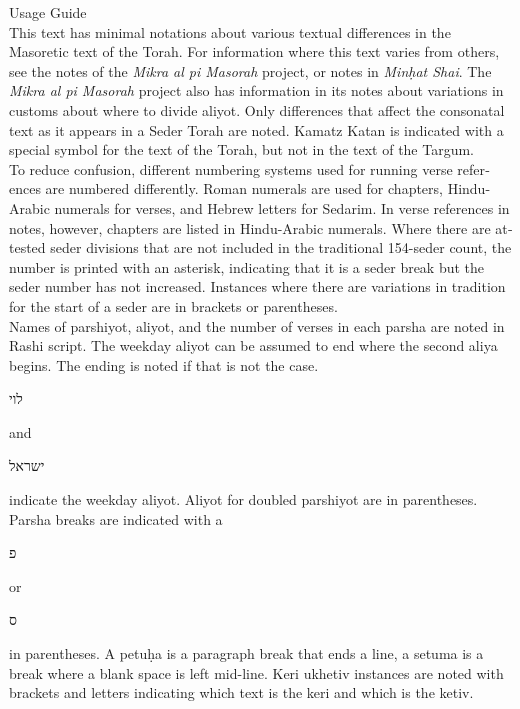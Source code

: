 \clearpage
{}	
\begin{minipage}{\textwidth}\englishfont
	
	\begin{english}
		\vspace{16pt}
		\Large Usage Guide\vspace{12pt}\\
		\normalsize
		This text has minimal notations about various textual differences in the Masoretic text of the Torah. For information where this text varies from others, see the notes of the \textit{Mikra al pi Masorah} project, or notes in \textit{Min\d{h}at Shai}. The \textit{Mikra al pi Masorah} project also has information in its notes about variations in customs about where to divide aliyot. Only differences that affect the consonatal text as it appears in a Seder Torah are noted. Kamatz Katan is indicated with a special symbol for the text of the Torah, but not in the text of the Targum.\\
		
		To reduce confusion, different numbering systems used for running verse references are numbered differently. Roman numerals are used for chapters, Hindu-Arabic numerals for verses, and Hebrew letters for Sedarim. In verse references in notes, however, chapters are listed in Hindu-Arabic numerals. Where there are attested seder divisions that are not included in the traditional 154-seder count, the number is printed with an asterisk, indicating that it is a seder break but the seder number has not increased. Instances where there are variations in tradition for the start of a seder are in brackets or parentheses.\\
		
		Names of parshiyot, aliyot, and the number of verses in each parsha are noted in Rashi script. The weekday aliyot can be assumed to end where the second aliya begins. The ending is noted if that is not the case.   \begin{hebrew}\footnotesize לוי \normalsize\end{hebrew} and  \begin{hebrew}\footnotesize ישראל\normalsize\end{hebrew} indicate the weekday aliyot. Aliyot for doubled parshiyot are in parentheses.\\
		
		Parsha breaks are indicated with a \begin{hebrew}\footnotesize פ\normalsize \end{hebrew} or \begin{hebrew}\footnotesize ס\normalsize\end{hebrew} in parentheses. A petu\d{h}a is a paragraph break that ends a line, a setuma is a break where a blank space is left mid-line. Keri ukhetiv instances are noted with brackets and letters indicating which text is the keri and which is the ketiv.\\
		

\end{english}
\end{minipage}
